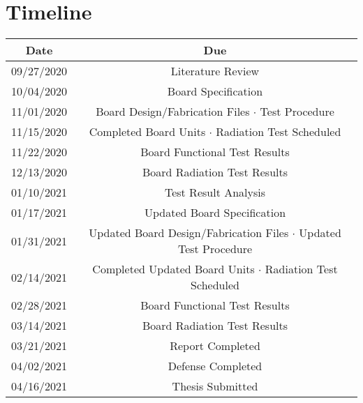 \documentclass{article}
\begin{document}
\section{Timeline}
    \begin{tabular}{|c|c|}
        \hline
        \textbf{Date} & \textbf{Due} \\\hline
        09/27/2020 & Literature Review \\\hline
        10/04/2020 & Board Specification \\\hline
        11/01/2020 & Board Design/Fabrication Files $\cdot$ Test Procedure \\\hline
        11/15/2020 & Completed Board Units $\cdot$ Radiation Test Scheduled \\\hline
        11/22/2020 & Board Functional Test Results \\\hline
        12/13/2020 & Board Radiation Test Results \\\hline
        01/10/2021 & Test Result Analysis \\\hline
        01/17/2021 & Updated Board Specification \\\hline
        01/31/2021 & Updated Board Design/Fabrication Files $\cdot$ Updated Test Procedure  \\\hline
        02/14/2021 & Completed Updated Board Units $\cdot$ Radiation Test Scheduled \\\hline
        02/28/2021 & Board Functional Test Results \\\hline
        03/14/2021 & Board Radiation Test Results \\\hline
        03/21/2021 & Report Completed \\\hline
        04/02/2021 & Defense Completed \\\hline
        04/16/2021 & Thesis Submitted \\\hline
    \end{tabular}
\end{document}
